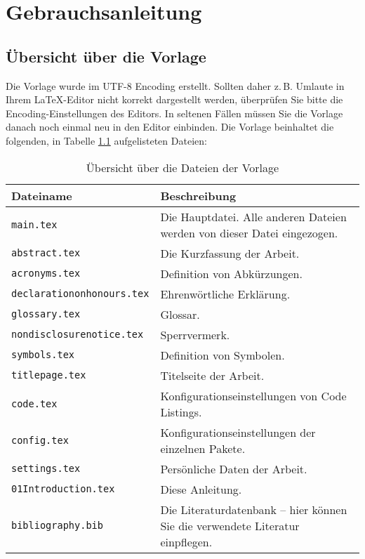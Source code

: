 \chapter{Gebrauchsanleitung}

\section{Übersicht über die Vorlage}
Die Vorlage wurde im UTF-8 Encoding erstellt. Sollten daher z.\,B. Umlaute in Ihrem \LaTeX-Editor nicht korrekt dargestellt werden, überprüfen Sie bitte die Encoding-Einstellungen des Editors. In seltenen Fällen müssen Sie die Vorlage danach noch einmal neu in den Editor einbinden.
Die Vorlage beinhaltet die folgenden, in Tabelle \ref{tab:dateien} aufgelisteten Dateien:

\begin{table}[H]
	\centering
    \begin{tabular}{lp{10cm}}
    	\textbf{Dateiname} & \textbf{Beschreibung}\\\toprule
    	\texttt{main.tex} & Die Hauptdatei. Alle anderen Dateien werden von dieser Datei eingezogen. \\
    	\texttt{abstract.tex} & Die Kurzfassung der Arbeit. \\
    	\texttt{acronyms.tex} & Definition von Abkürzungen. \\
    	\texttt{declarationonhonours.tex} & Ehrenwörtliche Erklärung.\\
    	\texttt{glossary.tex} & Glossar. \\
    	\texttt{nondisclosurenotice.tex} & Sperrvermerk.\\
    	\texttt{symbols.tex} & Definition von Symbolen.\\
    	\texttt{titlepage.tex} & Titelseite der Arbeit.\\
    	\texttt{code.tex} & Konfigurationseinstellungen von Code Listings.\\
    	\texttt{config.tex} & Konfigurationseinstellungen der einzelnen Pakete.\\
    	\texttt{settings.tex} & Persönliche Daten der Arbeit.\\
    	\texttt{01Introduction.tex} & Diese Anleitung.\\
    	\texttt{bibliography.bib} &  Die Literaturdatenbank -- hier können Sie die verwendete Literatur einpflegen.\\\bottomrule
    \end{tabular}
    \caption{Übersicht über die Dateien der Vorlage}
    \label{tab:dateien}
\end{table}

